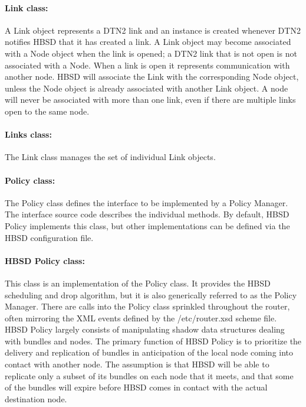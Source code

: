 \paragraph{Link class:}

A Link object represents a DTN2 link and an instance is created whenever DTN2 notifies HBSD that it has created a link. A Link object may become associated with a Node object when the link is opened; a DTN2 link that is not open is not associated with a Node. When a link is open it represents communication with another node. HBSD will associate the Link with the corresponding Node object, unless the Node object is already associated with another Link object.
A node will never be associated with more than one link, even if there are multiple links open to the same node.

\paragraph{Links class:}
The Link class manages the set of individual Link objects.

\paragraph{Policy class:}
The Policy class defines the interface to be implemented by a Policy Manager.
The interface source code describes the individual methods. By default,
HBSD Policy implements this class, but other implementations can be defined
via the HBSD configuration file.

\paragraph{HBSD Policy class:}

This class is an implementation of the Policy class. It provides the HBSD
scheduling and drop algorithm, but it is also generically referred to as the Policy Manager. There are calls into the Policy class sprinkled throughout the router, often mirroring the XML events defined by the /etc/router.xsd scheme file. HBSD Policy largely consists of manipulating shadow data structures dealing with bundles and nodes. The primary function of HBSD Policy is to prioritize the delivery and replication of bundles in anticipation of the local node coming into contact with another node. The assumption is that HBSD will be able to replicate only a subset of its bundles on each node that it meets, and that some of the bundles will expire before HBSD comes in contact with the actual destination node.


